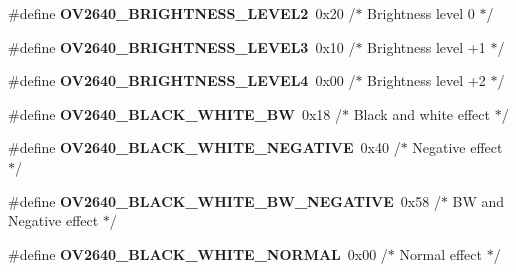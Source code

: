 \begin{DoxyCompactItemize}
\item 
\mbox{\label{group___o_v2640___exported___constants_gae67b932a12175d4c5a730d0fcfe95ad1}} 
\#define {\bfseries O\+V2640\+\_\+\+B\+R\+I\+G\+H\+T\+N\+E\+S\+S\+\_\+\+L\+E\+V\+E\+L2}~0x20   /$\ast$ Brightness level 0          $\ast$/
\item 
\mbox{\label{group___o_v2640___exported___constants_ga93465768d1a5a1edf43b4cfd8cb12cd4}} 
\#define {\bfseries O\+V2640\+\_\+\+B\+R\+I\+G\+H\+T\+N\+E\+S\+S\+\_\+\+L\+E\+V\+E\+L3}~0x10   /$\ast$ Brightness level +1         $\ast$/
\item 
\mbox{\label{group___o_v2640___exported___constants_gabd96785c103b4e6016861648336701c3}} 
\#define {\bfseries O\+V2640\+\_\+\+B\+R\+I\+G\+H\+T\+N\+E\+S\+S\+\_\+\+L\+E\+V\+E\+L4}~0x00   /$\ast$ Brightness level +2         $\ast$/
\item 
\mbox{\label{group___o_v2640___exported___constants_ga6d3ae3018d0249ad37415c5a36d36485}} 
\#define {\bfseries O\+V2640\+\_\+\+B\+L\+A\+C\+K\+\_\+\+W\+H\+I\+T\+E\+\_\+\+BW}~0x18   /$\ast$ Black and white effect      $\ast$/
\item 
\mbox{\label{group___o_v2640___exported___constants_gaaf25629a164b23a5a2637e3d33baed89}} 
\#define {\bfseries O\+V2640\+\_\+\+B\+L\+A\+C\+K\+\_\+\+W\+H\+I\+T\+E\+\_\+\+N\+E\+G\+A\+T\+I\+VE}~0x40   /$\ast$ Negative effect             $\ast$/
\item 
\mbox{\label{group___o_v2640___exported___constants_gaa75ac4c7dbfd8dbf10cbac7a3b7cec9e}} 
\#define {\bfseries O\+V2640\+\_\+\+B\+L\+A\+C\+K\+\_\+\+W\+H\+I\+T\+E\+\_\+\+B\+W\+\_\+\+N\+E\+G\+A\+T\+I\+VE}~0x58   /$\ast$ B\+W and Negative effect      $\ast$/
\item 
\mbox{\label{group___o_v2640___exported___constants_ga343d3a464b736ccc0b3c39b77d583028}} 
\#define {\bfseries O\+V2640\+\_\+\+B\+L\+A\+C\+K\+\_\+\+W\+H\+I\+T\+E\+\_\+\+N\+O\+R\+M\+AL}~0x00   /$\ast$ Normal effect               $\ast$/
\item 

\end{DoxyCompactItemize}
